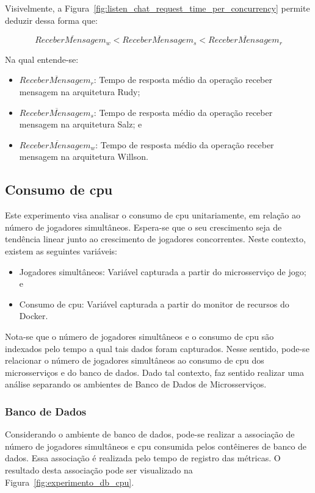 Visivelmente, a Figura~\ref{fig:listen_chat_request_time_per_concurrency} permite deduzir dessa forma que:

$$
  \overline{ReceberMensagem_{w}} < \overline{ReceberMensagem_{s}} <\overline{ReceberMensagem_{r}}
$$

Na qual entende-se:

\begin{itemize}
 \item $\overline{ReceberMensagem_{r}}$: Tempo de resposta médio da operação receber mensagem na arquitetura Rudy;
 \item $\overline{ReceberMensagem_{s}}$: Tempo de resposta médio da operação receber mensagem na arquitetura Salz; e
 \item $\overline{ReceberMensagem_{w}}$: Tempo de resposta médio da operação receber mensagem na arquitetura Willson.
\end{itemize}

\subsection{Consumo de \ac{cpu}}

Este experimento visa analisar o consumo de \ac{cpu} unitariamente, em relação ao número de jogadores simultâneos.
%
Espera-se que o seu crescimento seja de tendência linear junto ao crescimento de jogadores concorrentes.
%
Neste contexto, existem as seguintes variáveis:

\begin{itemize}
    \item Jogadores simultâneos: Variável capturada a partir do microsserviço de jogo; e
    \item Consumo de \ac{cpu}: Variável capturada a partir do monitor de recursos do Docker.
\end{itemize}

Nota-se que o número de jogadores simultâneos e o consumo de \ac{cpu} são indexados pelo tempo a qual tais dados foram capturados.
%
Nesse sentido, pode-se relacionar o número de jogadores simultâneos ao consumo de \ac{cpu} dos microsserviços e do banco de dados.
%
Dado tal contexto, faz sentido realizar uma análise separando os ambientes de Banco de Dados de Microsserviços.

\subsubsection{Banco de Dados}

Considerando o ambiente de banco de dados, pode-se realizar a associação de número de jogadores simultâneos e \ac{cpu} consumida pelos contêineres de banco de dados.
%
Essa associação é realizada pelo tempo de registro das métricas.
%
O resultado desta associação pode ser visualizado na Figura~\ref{fig:experimento_db_cpu}.




